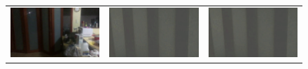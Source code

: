 \documentclass[letterpaper, 10 pt, conference]{ieeeconf}  %
\begin{document}
\begin{figure}[htbp]
\begin{tabular}{ccc}
 \includegraphics[width=\imgW,height=\imgH]{rio-q5} &
 \includegraphics[width=\imgW,height=\imgH]{rio-rf5-2} &
 \includegraphics[width=\imgW,height=\imgH]{rio-r5-2} \\
 

\end{tabular}
\end{figure}
\end{document}
